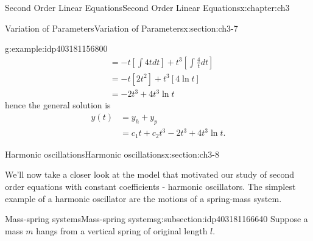\documentclass[oneside,10pt,]{book}
\numberwithin{equation}{section}
\numberwithin{equation}{section}
\newcommand{\amp}{&}
\begin{document}
\begin{chapterptx}{Second Order Linear Equations}{}{Second Order Linear Equations}{}{}{x:chapter:ch3}
\begin{sectionptx}{Variation of Parameters}{}{Variation of Parameters}{}{}{x:section:ch3-7}
\begin{example}{}{g:example:idp403181156800}
\begin{align*}
\amp =-t\left[\int4tdt\right]+t^{3}\left[\int\frac{4}{t}dt\right]\\
\amp =-t\left[2t^{2}\right]+t^{3}\left[4\ln t\right]\\
\amp =-2t^{3}+4t^{3}\ln t
\end{align*}
hence the general solution is%
\begin{align*}
y(t) \amp =y_{h}+y_{p}\\
\amp =c_{1}t+c_{2}t^{3}-2t^{3}+4t^{3}\ln t.
\end{align*}
%
\end{example}
\end{sectionptx}
%
%
\typeout{************************************************}
\typeout{************************************************}
%
\begin{sectionptx}{Harmonic oscillations}{}{Harmonic oscillations}{}{}{x:section:ch3-8}
\begin{introduction}{}%
We'll now take a closer look at the model that motivated our study of second order equations with constant coefficients - harmonic oscillators. The simplest example of a harmonic oscillator are the motions of a spring-mass system.%
\end{introduction}%
%
%
\typeout{************************************************}
\typeout{************************************************}
%
\begin{subsectionptx}{Mass-spring systems}{}{Mass-spring systems}{}{}{g:subsection:idp403181166640}
Suppose a mass \(m\) hangs from a vertical spring of original length \(l\). \begin{sidebyside}{2}{0}{0}{0}%
\begin{sbspanel}{0.5}%

\end{sbspanel}
\end{sidebyside}
\end{subsectionptx}
\end{sectionptx}
\end{chapterptx}
\end{document}
